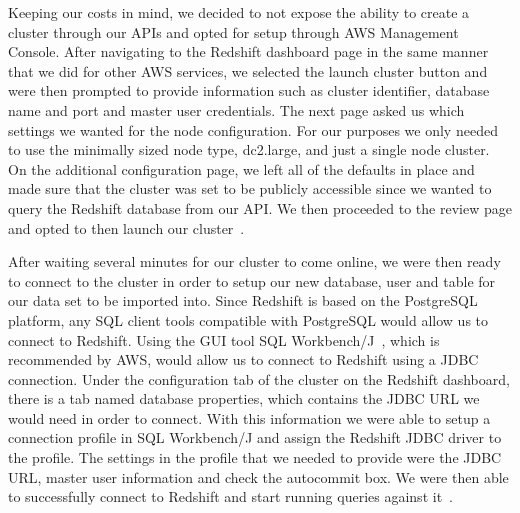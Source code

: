 Keeping our costs in mind, we decided to not expose the ability to create a 
cluster through our APIs and opted for setup through AWS Management Console. 
After navigating to the Redshift dashboard page in the same manner that we did 
for other AWS services, we selected the launch cluster button and were then 
prompted to provide information such as cluster identifier, database name and 
port and master user credentials. The next page asked us which settings we 
wanted for the node configuration. For our purposes we only needed to use the 
minimally sized node type, dc2.large, and just a single node cluster. On the 
additional configuration page, we left all of the defaults in place and made 
sure that the cluster was set to be publicly accessible since we wanted to 
query the Redshift database from our API. We then proceeded to the review page 
and opted to then launch our 
cluster~\cite{hid-sp18-521-redshift-gettingstarted}.  

After waiting several minutes for our cluster to come online, we were then 
ready to connect to the cluster in order to setup our new database, user and 
table for our data set to be imported into. Since Redshift is based on the 
PostgreSQL platform, any SQL client tools compatible with PostgreSQL would 
allow us to connect to Redshift. Using the GUI tool 
SQL Workbench/J~\cite{hid-sp18-521-sqlworkbenchj}, which is recommended by 
AWS, would allow us to connect to Redshift using a JDBC connection. Under the 
configuration tab of the cluster on the Redshift dashboard, there is a tab 
named database properties, which contains the JDBC URL we would need in order 
to connect. With this information we were able to setup a connection profile 
in SQL Workbench/J and assign the Redshift JDBC driver to the profile. The 
settings in the profile that we needed to provide were the JDBC URL, master 
user information and check the autocommit box. We were then able to 
successfully connect to Redshift and start running queries against 
it~\cite{hid-sp18-521-redshift-gettingstarted}.  

